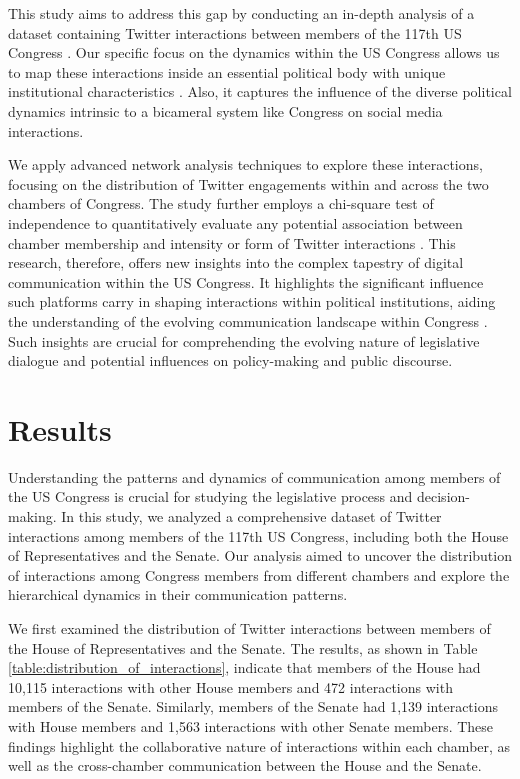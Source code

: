 \documentclass[11pt]{article}
\begin{document}
This study aims to address this gap by conducting an in-depth analysis of a dataset containing Twitter interactions between members of the 117th US Congress \cite{Hua2020TowardsMA}. Our specific focus on the dynamics within the US Congress allows us to map these interactions inside an essential political body with unique institutional characteristics \cite{Barber2019WhoLW, Farhadloo2018AssociationsOT}. Also, it captures the influence of the diverse political dynamics intrinsic to a bicameral system like Congress on social media interactions.

We apply advanced network analysis techniques to explore these interactions, focusing on the distribution of Twitter engagements within and across the two chambers of Congress. The study further employs a chi-square test of independence to quantitatively evaluate any potential association between chamber membership and intensity or form of Twitter interactions \cite{Litwin2011SocialNT, Hagan1999SyringeEA}. This research, therefore, offers new insights into the complex tapestry of digital communication within the US Congress. It highlights the significant influence such platforms carry in shaping interactions within political institutions, aiding the understanding of the evolving communication landscape within Congress \cite{Barber2016LessIM, Omodei2015CharacterizingII}. Such insights are crucial for comprehending the evolving nature of legislative dialogue and potential influences on policy-making and public discourse.

\section*{Results}

Understanding the patterns and dynamics of communication among members of the US Congress is crucial for studying the legislative process and decision-making. In this study, we analyzed a comprehensive dataset of Twitter interactions among members of the 117th US Congress, including both the House of Representatives and the Senate. Our analysis aimed to uncover the distribution of interactions among Congress members from different chambers and explore the hierarchical dynamics in their communication patterns.

We first examined the distribution of Twitter interactions between members of the House of Representatives and the Senate. The results, as shown in Table \ref{table:distribution_of_interactions}, indicate that members of the House had 10,115 interactions with other House members and 472 interactions with members of the Senate. Similarly, members of the Senate had 1,139 interactions with House members and 1,563 interactions with other Senate members. These findings highlight the collaborative nature of interactions within each chamber, as well as the cross-chamber communication between the House and the Senate.
\end{document}
